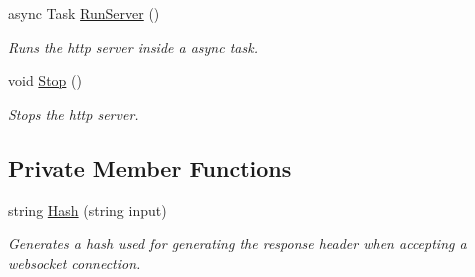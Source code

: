 \begin{DoxyCompactItemize}
async Task \mbox{\hyperlink{class_simple_web_socket_server_library_1_1_simple_web_socket_http_server_1_1_web_socket_http_server_a57b76afde46781493110c513b984417c}{Run\+Server}} ()
\begin{DoxyCompactList}\small\item\em Runs the http server inside a async task. \end{DoxyCompactList}\item 
void \mbox{\hyperlink{class_simple_web_socket_server_library_1_1_simple_web_socket_http_server_1_1_web_socket_http_server_af61f4c057d2af50ed5b8942424dbf3ad}{Stop}} ()
\begin{DoxyCompactList}\small\item\em Stops the http server. \end{DoxyCompactList}\end{DoxyCompactItemize}
\subsection*{Private Member Functions}
\begin{DoxyCompactItemize}
\item 
string \mbox{\hyperlink{class_simple_web_socket_server_library_1_1_simple_web_socket_http_server_1_1_web_socket_http_server_a21e28d41ea86e21f91848fc50b6cea66}{Hash}} (string input)
\begin{DoxyCompactList}\small\item\em Generates a hash used for generating the response header when accepting a websocket connection. \end{DoxyCompactList}\end{DoxyCompactItemize}
